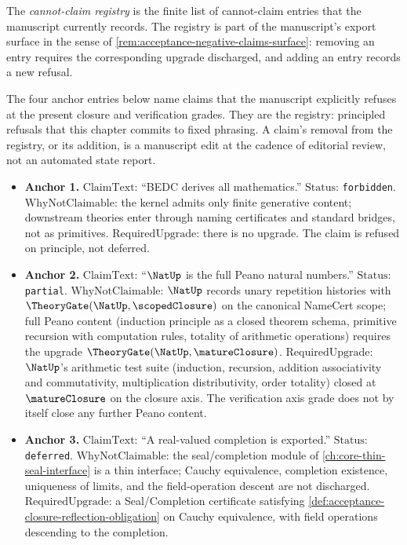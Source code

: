 \begin{definition}
\label{def:acceptance-cannot-claim-registry}
The \emph{cannot-claim registry} is the finite list of cannot-claim entries that the manuscript currently records. The registry is part of the manuscript's export surface in the sense of \autoref{rem:acceptance-negative-claims-surface}: removing an entry requires the corresponding upgrade discharged, and adding an entry records a new refusal.
\end{definition}

\begin{remark}
\label{rem:acceptance-anchor-entries}
The four anchor entries below name claims that the manuscript explicitly refuses at the present closure and verification grades. They are the registry: principled refusals that this chapter commits to fixed phrasing. A claim's removal from the registry, or its addition, is a manuscript edit at the cadence of editorial review, not an automated state report.
\begin{itemize}
  \item \textbf{Anchor 1.} $\mathrm{ClaimText}$: ``BEDC derives all mathematics.'' $\mathrm{Status}$: \texttt{forbidden}. $\mathrm{WhyNotClaimable}$: the kernel admits only finite generative content; downstream theories enter through naming certificates and standard bridges, not as primitives. $\mathrm{RequiredUpgrade}$: there is no upgrade. The claim is refused on principle, not deferred.
  \item \textbf{Anchor 2.} $\mathrm{ClaimText}$: ``$\NatUp$ is the full Peano natural numbers.'' $\mathrm{Status}$: \texttt{partial}. $\mathrm{WhyNotClaimable}$: $\NatUp$ records unary repetition histories with $\TheoryGate(\NatUp, \scopedClosure)$ on the canonical NameCert scope; full Peano content (induction principle as a closed theorem schema, primitive recursion with computation rules, totality of arithmetic operations) requires the upgrade $\TheoryGate(\NatUp, \matureClosure)$. $\mathrm{RequiredUpgrade}$: $\NatUp$'s arithmetic test suite (induction, recursion, addition associativity and commutativity, multiplication distributivity, order totality) closed at $\matureClosure$ on the closure axis. The verification axis grade does not by itself close any further Peano content.
  \item \textbf{Anchor 3.} $\mathrm{ClaimText}$: ``A real-valued completion is exported.'' $\mathrm{Status}$: \texttt{deferred}. $\mathrm{WhyNotClaimable}$: the seal/completion module of \autoref{ch:core-thin-seal-interface} is a thin interface; Cauchy equivalence, completion existence, uniqueness of limits, and the field-operation descent are not discharged. $\mathrm{RequiredUpgrade}$: a Seal/Completion certificate satisfying \autoref{def:acceptance-closure-reflection-obligation} on Cauchy equivalence, with field operations descending to the completion.

\end{itemize}
\end{remark}
